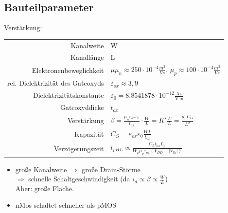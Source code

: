 \documentclass[6pt,a4paper]{scrartcl}
\newcommand{\Ra}[0]{\ensuremath{\Rightarrow}}									%
\begin{document}
\begin{multicols*}{3}
	\subsection{Bauteilparameter}
	Verstärkung:  \\
	\begin{tabular} {r | l}
		Kanalweite & W  \\
		Kanallänge & L  \\
		Elektronenbeweglichkeit & $\mu$\quad $\mu_n \approx 250 \cdot 10^{-4} \frac{m^2}{Vs}$, $\mu_p \approx 100 \cdot 10^{-4} \frac{m^2}{Vs}$ \\
		rel. Dielektrizität des Gateoxyds & $\varepsilon_{ox} \approx 3,9$ \\
		Dielektrizitätskonstante & $\varepsilon_0 = 8.8541878 \cdot 10^{-12} \frac{\mathrm{A\,s}}{\mathrm{V\,m}}$ \\
		Gateoxyddicke & $t_{ox}$ \\
		Verstärkung & $\beta = \frac{\mu_n \varepsilon_{ox} \varepsilon_0}{t_{ox}} \cdot \frac{W}{L} = K' \frac{W}{L} = \frac{\mu_n C_G}{L^2}$ \\
		Kapazität & $C_G = \varepsilon_{ox} \varepsilon_0 \frac{WL}{t_{ox}}$ \\
		Verzögerungszeit & $t_{pHL} \propto \frac{C_L t_{ox} L_p}{W_p \mu_p \varepsilon_{ox} (V_{DD} - |V_{th}|)}$ \\
	\end{tabular}
	\begin{itemize}
		\item große Kanalweite $\Ra$ große Drain-Störme \\ $\Ra$ schnelle Schaltgeschwindigkeit (da $i_d \propto \beta \propto \frac{W}{L}$) \\
		Aber: große Fläche.
		\item nMos schaltet schneller als pMOS 
	\end{itemize}
	

\end{multicols*}
\end{document}
